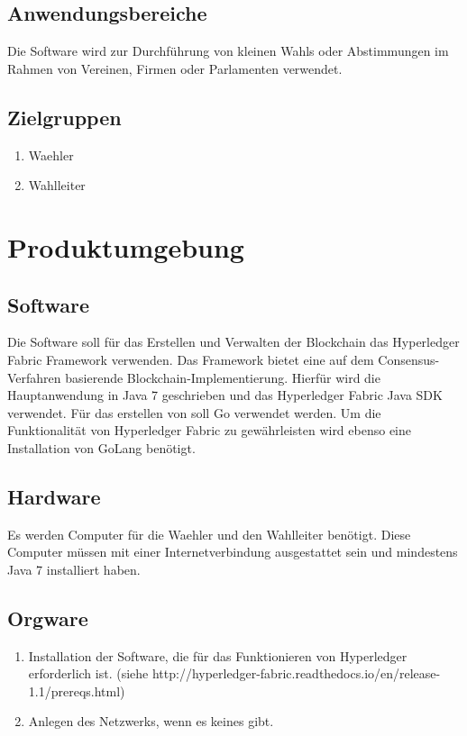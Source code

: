 \documentclass[parskip=full,11pt,twoside]{scrartcl}
\begin{document}
\subsection{Anwendungsbereiche}
Die Software wird zur Durchführung von kleinen \glspl{Wahl} oder Abstimmungen im Rahmen von Vereinen, Firmen oder Parlamenten verwendet.

\subsection{Zielgruppen}
\begin{enumerate}
  \item \gls{Waehler}
  \item \gls{Wahlleiter}
\end{enumerate}

\section{Produktumgebung}

\subsection{Software}
Die Software soll für das Erstellen und Verwalten der \gls{Blockchain} das Hyperledger Fabric Framework verwenden. Das Framework bietet eine auf dem \gls{Consensus-Verfahren} basierende Blockchain-Implementierung.
Hierfür wird die Hauptanwendung in Java 7 geschrieben und das Hyperledger Fabric Java SDK verwendet. Für das erstellen von  soll Go verwendet werden.
Um die Funktionalität von Hyperledger Fabric zu gewährleisten wird ebenso eine Installation von GoLang benötigt.

\subsection{Hardware}
Es werden Computer für die \gls{Waehler} und den \gls{Wahlleiter} benötigt. Diese Computer müssen mit einer Internetverbindung ausgestattet sein und mindestens Java 7 installiert haben.

\subsection{Orgware}
\begin{enumerate}
\item Installation der Software, die für das Funktionieren von Hyperledger erforderlich ist. (siehe http://hyperledger-fabric.readthedocs.io/en/release-1.1/prereqs.html)
\item Anlegen des Netzwerks, wenn es keines gibt.
\end{enumerate}
\end{document}
